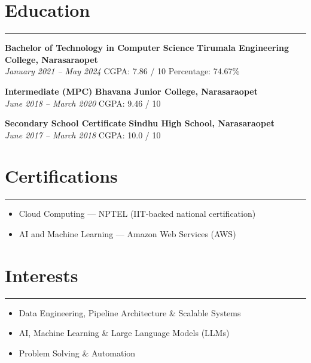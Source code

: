 \documentclass[12pt]{article}
\begin{document}
\section*{Education}
\vspace{1pt}\hrule\vspace{4pt}
\textbf{Bachelor of Technology in Computer Science} \hfill \textbf{Tirumala Engineering College, Narasaraopet} \\
\textit{January 2021 -- May 2024} \quad CGPA: 7.86 / 10 \quad Percentage: 74.67\%

\textbf{Intermediate (MPC)} \hfill \textbf{Bhavana Junior College, Narasaraopet} \\
\textit{June 2018 -- March 2020} \quad CGPA: 9.46 / 10

\textbf{Secondary School Certificate} \hfill \textbf{Sindhu High School, Narasaraopet} \\
\textit{June 2017 -- March 2018} \quad CGPA: 10.0 / 10

\vspace{6pt}

\section*{Certifications}
\vspace{1pt}\hrule\vspace{4pt}
\begin{itemize}
  \item Cloud Computing --- NPTEL (IIT-backed national certification)
  \item AI and Machine Learning --- Amazon Web Services (AWS)
\end{itemize}

\section*{Interests}
\vspace{1pt}\hrule\vspace{4pt}
\begin{itemize}
  \item Data Engineering, Pipeline Architecture \& Scalable Systems
  \item AI, Machine Learning \& Large Language Models (LLMs)
  \item Problem Solving \& Automation
\end{itemize}
\end{document}
